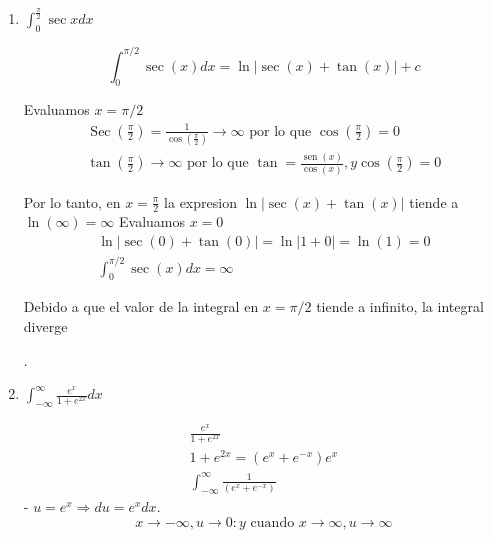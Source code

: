\documentclass{article}
\begin{document}
\begin{enumerate}
\begin{enumerate}
Evaluamos la integral
$$
\begin{aligned}
\frac{1}{2} \int_0^1 1 d x=\frac{1}{2}[x]_0^1 & =\frac{1}{2}(1-0)=\frac{1}{2} \\
\frac{1}{2} \int_0^1 \cos (2 x) d x=\frac{1}{2}\left[\frac{\operatorname{sen}(2 x)}{2}\right]_0^1 & =\frac{1}{2} \cdot \frac{1}{2}[\operatorname{sen}(2 \cdot 1)-\operatorname{sen}(0)] \\
\frac{1}{2} \int_0^1 \cos (2 x) d x & =\frac{1}{4} \operatorname{sen}(2)
\end{aligned}
$$

Por lo tanto, la solución de la integral es:
$$
\frac{1}{2} \int_0^1 \cos (2 x) d x=\frac{1}{2}+\frac{1}{4} \operatorname{sen}(2)
$$
        \newpage
		\item $\int_{0}^{\frac{\pi}{2}} \sec x dx   $

$$
\int_0^{\pi / 2} \sec (x) d x=\ln |\sec (x)+\tan (x)|+c
$$

Evaluamos $x=\pi / 2$
$$
\begin{gathered}
\operatorname{Sec}\left(\frac{\pi}{2}\right)=\frac{1}{\cos \left(\frac{\pi}{2}\right)} \rightarrow \infty \text { por lo que } \cos \left(\frac{\pi}{2}\right)=0 \\
\tan \left(\frac{\pi}{2}\right) \rightarrow \infty \text { por lo que } \tan =\frac{\operatorname{sen}(x)}{\cos (x)}, y \cos \left(\frac{\pi}{2}\right)=0
\end{gathered}
$$

Por lo tanto, en $x=\frac{\pi}{2}$ la expresion $\ln |\sec (x)+\tan (x)|$ tiende a $\ln (\infty)=\infty$
Evaluamos $x=0$
$$
\begin{gathered}
\ln |\sec (0)+\tan (0)|=\ln |1+0|=\ln (1)=0 \\
\int_0^{\pi / 2} \sec (x) d x=\infty
\end{gathered}
$$

Debido a que el valor de la integral en $x=\pi / 2$ tiende a infinito, la integral diverge

.



        
		\item $ \int_{-\infty}^{\infty} \frac{e^x}{1+e^{2x}} dx$

$$
\begin{gathered}
\frac{e^x}{1+e^{2 x}} \\
1+e^{2 x}=\left(e^x+e^{-x}\right) e^x \\
\int_{-\infty}^{\infty} \frac{1}{\left(e^x+e^{-x}\right)}
\end{gathered}
$$
- $u=e^x \Rightarrow d u=e^x d x$.
$$
x \rightarrow-\infty, u \rightarrow 0: y \text { cuando } x \rightarrow \infty, u \rightarrow \infty
$$


\end{enumerate}
\end{enumerate}
\end{document}
